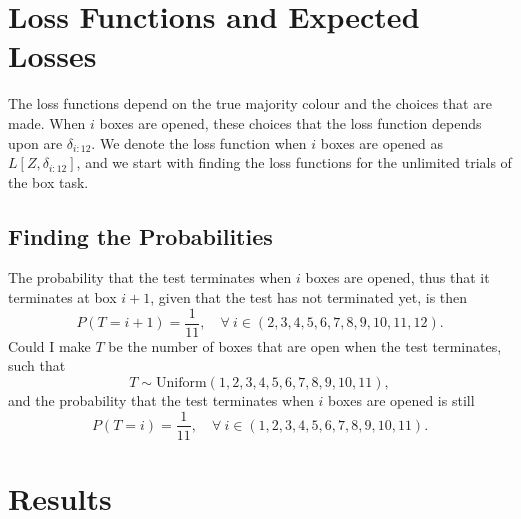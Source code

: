 \section{Loss Functions and Expected Losses}
The loss functions depend on the true majority colour and the choices that are made. When $i$ boxes are opened, these choices that the loss function depends upon are $\delta_{i:12}$. We denote the loss function when $i$ boxes are opened as $L[Z,\delta_{i:12}]$, and we start with finding the loss functions for the unlimited trials of the box task. 




\subsection{Finding the Probabilities}

The probability that the test terminates when $i$ boxes are opened, thus that it terminates at box $i+1$, given that the test has not terminated yet, is then
\begin{equation*}
    P(T=i+1) = \frac{1}{11}, \quad \forall \: i \in (2,3,4,5,6,7,8,9,10,11,12).
\end{equation*}
Could I make $T$ be the number of boxes that are open when the test terminates, such that 
\begin{equation}
    T \sim \text{Uniform}(1,2,3,4,5,6,7,8,9,10,11),
\end{equation}
and the probability that the test terminates when $i$ boxes are opened is still 
\begin{equation*}
    P(T=i) = \frac{1}{11}, \quad \forall \: i \in (1,2,3,4,5,6,7,8,9,10,11).
\end{equation*}










\section{Results}


